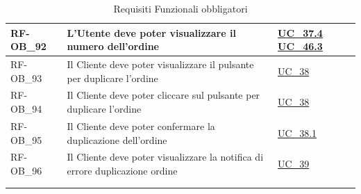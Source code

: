 \begin{longtable}{|>{\raggedright}p{}|>{\raggedright\arraybackslash}p{}|>{\raggedright\arraybackslash}p{}|}
	\hline
	RF-OB\_92 \hypertarget{rf-ob_92} & L'Utente deve poter visualizzare il numero dell'ordine & \hyperref[uc_37.4]{UC\_37.4} \newline \hyperref[uc_46.3]{UC\_46.3} \\
	\hline
	RF-OB\_93 \hypertarget{rf-ob_93} & Il Cliente deve poter visualizzare il pulsante per duplicare l'ordine & \hyperref[uc_38]{UC\_38} \\
	\hline
	RF-OB\_94 \hypertarget{rf-ob_94} & Il Cliente deve poter cliccare sul pulsante per duplicare l'ordine & \hyperref[uc_38]{UC\_38} \\
	\hline
	RF-OB\_95 \hypertarget{rf-ob_95} & Il Cliente deve poter confermare la duplicazione dell'ordine & \hyperref[uc_38.1]{UC\_38.1} \\
	\hline
	RF-OB\_96 \hypertarget{rf-ob_96} & Il Cliente deve poter visualizzare la notifica di errore duplicazione ordine & \hyperref[uc_39]{UC\_39} \\
	\hline
	\multicolumn{3}{c}{} \\
	\caption{Requisiti Funzionali obbligatori}\hypertarget{tab:funzionali_obbligatori}\\
\end{longtable}

	
